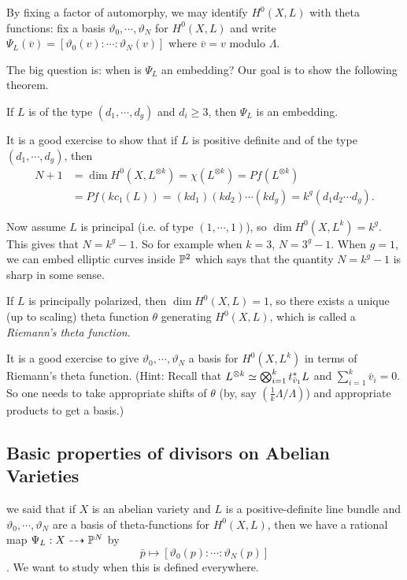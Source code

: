 By fixing a factor of automorphy, we may identify $H^0(X,L)$ with theta functions: fix a basis $\vartheta_0,\cdots,\vartheta_N$ for $H^0(X,L)$ and write $\Psi_L(\overline{v})=[\vartheta_0(v):\cdots:\vartheta_N(v)]$ where $\overline{v}=v$ modulo $\Lambda$. 

The big question is: when is $\Psi_L$ an embedding? Our goal is to show the following theorem.
\begin{theorem}[Lefschetz]
If $L$ is of the type $(d_1,\cdots,d_g)$ and $d_i\geq 3$, then $\Psi_L$ is an embedding.
\end{theorem}

\begin{example}
It is a good exercise to show that if $L$ is positive definite and of the type $(d_1,\cdots,d_g)$, then 
\begin{align*}
N+1 &=\dim H^0(X,L^{\otimes k})=\chi(L^{\otimes k})=Pf(L^{\otimes k})\\
&=Pf(k c_1(L))=(kd_1)(kd_2)\cdots (kd_g)=k^g(d_1d_2\cdots d_g).
\end{align*}

Now assume $L$ is principal (i.e. of type $(1,\cdots,1)$), so $\dim H^0(X,L^k)=k^g$. This gives that $N=k^g-1$. So for example when $k=3$, $N=3^g-1$. When $g=1$, we can embed elliptic curves inside ${\mathbb P}^2$ which says that the quantity $N=k^g-1$ is sharp in some sense. 
\end{example}

If $L$ is principally polarized, then $\dim H^0(X,L)=1$, so there exists a unique (up to scaling) theta function $\theta$ generating $H^0(X,L)$, which is called a \emph{Riemann's theta function}. 

It is a good exercise to give $\vartheta_0,\cdots,\vartheta_N$ a basis for $H^0(X,L^{k})$ in terms of Riemann's theta function. (Hint: Recall that $L^{\otimes k}\simeq \bigotimes_{i=1}^k t_{\bar{v}_1}^* L$ and $\sum_{i=1}^k \bar{v}_i=0$. So one needs to take appropriate shifts of $\theta$ (by, say $(\frac{1}{k}\Lambda/\Lambda)$) and appropriate products to get a basis.)

\subsection{Basic properties of divisors on Abelian Varieties}
we said that if $X$ is an abelian variety and $L$ is a positive-definite line bundle and $\vartheta_0,\cdots, \vartheta_N$ are a basis of theta-functions for $H^0(X,L)$, then we have a rational map $\Psi_L: X\dashrightarrow {\mathbb P}^N$ by
$$\bar{p}\mapsto [\vartheta_0(p):\cdots:\vartheta_N(p)]$$. We want to study when this is defined everywhere.

